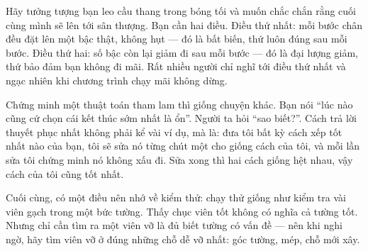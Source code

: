 \documentclass[../../algorithm.tex]{subfiles}
\begin{document}
\begin{dongian}
Hãy tưởng tượng bạn leo cầu thang trong bóng tối và muốn chắc chắn rằng cuối cùng mình sẽ lên tới sân thượng. Bạn cần hai điều. Điều thứ nhất: mỗi bước chân đều đặt lên một bậc thật, không hụt --- đó là bất biến, thứ luôn đúng sau mỗi bước. Điều thứ hai: số bậc còn lại giảm đi sau mỗi bước --- đó là đại lượng giảm, thứ bảo đảm bạn không đi mãi. Rất nhiều người chỉ nghĩ tới điều thứ nhất và ngạc nhiên khi chương trình chạy mãi không dừng.

Chứng minh một thuật toán tham lam thì giống chuyện khác. Bạn nói ``lúc nào cũng cứ chọn cái kết thúc sớm nhất là ổn''. Người ta hỏi ``sao biết?''. Cách trả lời thuyết phục nhất không phải kể vài ví dụ, mà là: đưa tôi bất kỳ cách xếp tốt nhất nào của bạn, tôi sẽ sửa nó từng chút một cho giống cách của tôi, và mỗi lần sửa tôi chứng minh nó không xấu đi. Sửa xong thì hai cách giống hệt nhau, vậy cách của tôi cũng tốt nhất.

Cuối cùng, có một điều nên nhớ về kiểm thử: chạy thử giống như kiểm tra vài viên gạch trong một bức tường. Thấy chục viên tốt không có nghĩa cả tường tốt. Nhưng chỉ cần tìm ra một viên vỡ là đủ biết tường có vấn đề --- nên khi nghi ngờ, hãy tìm viên vỡ ở đúng những chỗ dễ vỡ nhất: góc tường, mép, chỗ mới xây.
\end{dongian}
\end{document}
